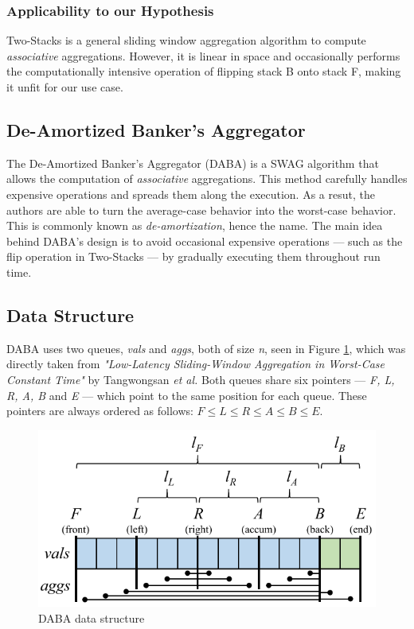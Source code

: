 \subsubsection*{Applicability to our Hypothesis}
Two-Stacks is a general sliding window aggregation algorithm to compute \textit{associative} aggregations. However, it is linear in space and occasionally performs the computationally intensive operation of flipping stack B onto stack F, making it unfit for our use case.


\subsection{De-Amortized Banker’s Aggregator} \label{sec:daba}

The De-Amortized Banker’s Aggregator (DABA) \cite{Tangwongsan-DABA} is a SWAG algorithm that allows the computation of \textit{associative} aggregations. This method carefully handles expensive operations and spreads them along the execution. As a resut, the authors are able to turn the average-case behavior into the worst-case behavior. This is commonly known as \textit{de-amortization}, hence the name. The main idea behind DABA's design is to avoid occasional expensive operations --- such as the flip operation in Two-Stacks --- by gradually executing them throughout run time.

\subsection*{Data Structure}

DABA uses two queues, \textit{vals} and \textit{aggs}, both of size \textit{n}, seen in Figure \ref{fig:daba-ds}, which was directly taken from \textit{"Low-Latency Sliding-Window Aggregation in Worst-Case Constant Time"} by Tangwongsan \emph{et al.} Both queues share six pointers --- \textit{F, L, R, A, B} and \textit{E} --- which point to the same position for each queue. These pointers are always ordered as follows: $F \leq L \leq R \leq A \leq B \leq E$.

\begin{figure}[!htb]
    \begin{center}
      \includegraphics[scale=0.6]{figures/daba-ds.png}
      \caption[DABA data structure]{DABA data structure \cite{Tangwongsan-DABA}}
      \label{fig:daba-ds}
    \end{center}
\end{figure}

